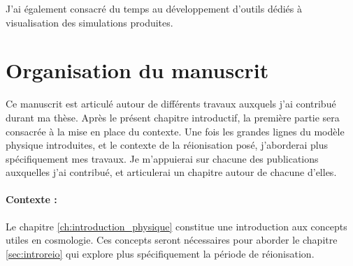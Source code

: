 
J'ai également consacré du temps au développement d'outils dédiés à visualisation des simulations produites.

%

\section*{Organisation du manuscrit}

Ce manuscrit est articulé autour de différents travaux auxquels j'ai contribué durant ma thèse.
Après le présent chapitre introductif, la première partie sera consacrée à la mise en place du contexte.
Une fois les grandes lignes du modèle physique introduites, et le contexte de la réionisation posé, j'aborderai plus spécifiquement mes travaux.
Je m'appuierai sur chacune des publications auxquelles j'ai contribué, et articulerai un chapitre autour de chacune d'elles. 

\paragraph{Contexte :}
Le chapitre \ref{ch:introduction_physique} constitue une introduction aux concepts utiles en cosmologie.
Ces concepts seront nécessaires pour aborder le chapitre \ref{sec:introreio} qui explore plus spécifiquement la période de réionisation.

